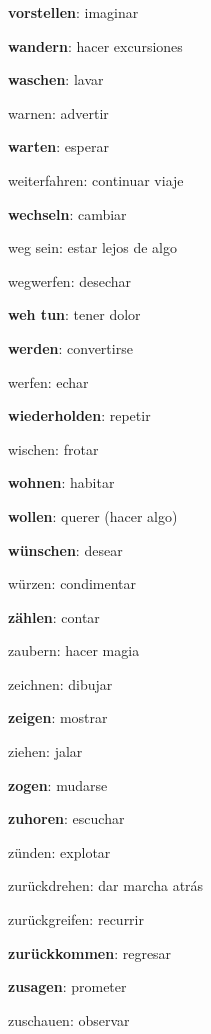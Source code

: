 \begin{multicols}{2}
\begin{myitemize}
\item \textbf{vorstellen}: imaginar
\item \textbf{wandern}: hacer excursiones
\item \textbf{waschen}: lavar
\item warnen: advertir
\item \textbf{warten}: esperar
\item weiterfahren: continuar viaje
\item \textbf{wechseln}: cambiar
\item weg sein: estar lejos de algo
\item wegwerfen: desechar
\item \textbf{weh tun}: tener dolor
\item \textbf{werden}: convertirse
\item werfen: echar
\item \textbf{wiederholden}: repetir
\item wischen: frotar
\item \textbf{wohnen}: habitar
\item \textbf{wollen}: querer (hacer algo)
\item \textbf{wünschen}: desear
\item würzen: condimentar
\item \textbf{zählen}: contar
\item zaubern: hacer magia
\item zeichnen: dibujar
\item \textbf{zeigen}: mostrar
\item ziehen: jalar
\item \textbf{zogen}: mudarse
\item \textbf{zuhoren}: escuchar
\item zünden: explotar
\item zurückdrehen: dar marcha atrás
\item zurückgreifen: recurrir
\item \textbf{zurückkommen}: regresar
\item \textbf{zusagen}: prometer
\item zuschauen: observar
\end{myitemize}
\end{multicols}
